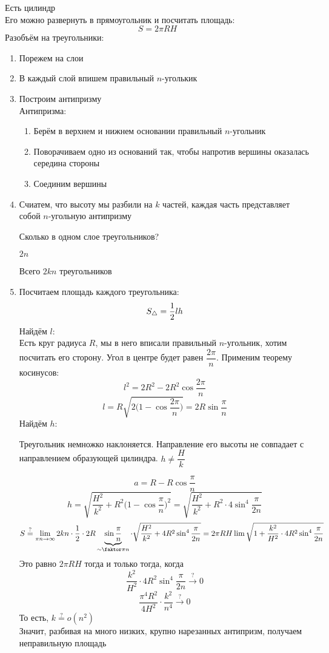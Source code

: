 \begin{eg}
	Есть цилиндр \\
	Его можно развернуть в прямоугольник и посчитать площадь:
	$$ S = 2\pi R H $$
	Разобъём на треугольники:
	\begin{enumerate}
		\item Порежем на слои
		\item В каждый слой впишем правильный $ n $-уголькик
		\item Построим антипризму \\
		Антипризма:
		\begin{enumerate}
			\item Берём в верхнем и нижнем основании правильный $ n $-угольник
			\item Поворачиваем одно из оснований так, чтобы напротив вершины оказалась середина стороны
			\item Соединим вершины
		\end{enumerate}
		\item Счиатем, что высоту мы разбили на $ k $ частей, каждая часть представляет собой $ n $-угольную антипризму
		\begin{quest}
			Сколько в одном слое треугольников?
		\end{quest}
		\begin{answer}
			$ 2n $
		\end{answer}
		Всего $ 2kn $ треугольников
		\item Посчитаем площадь каждого треугольника:
		$$ S_\triangle = \frac{1}2 lh $$
		Найдём $ l $: \\
		Есть круг радиуса $ R $, мы в него вписали правильный $ n $-угольник, хотим посчитать его сторону.  Угол в центре будет равен $ \dfrac{2\pi}n $. Применим теорему косинусов:
		$$ l^2 = 2R^2 - 2R^2 \cos \frac{2\pi}n $$
		$$ l = R \sqrt{2 \bigg( 1 - \cos \frac{2\pi}n \bigg) } = 2R\sin \frac\pi{n} $$
		Найдём $ h $:
		\begin{remark}
			Треугольник немножко наклоняется. Направление его высоты не совпадает с направлением образующей цилиндра. $ h \ne \dfrac{H}k $
		\end{remark}
		$$ a = R - R \cos \frac\pi{n} $$
		$$ h = \sqrt{\frac{H^2}{k^2} + R^2 \bigg(1 - \cos \frac\pi{n} \bigg)^2} = \sqrt{\frac{H^2}{k^2} + R^2 \cdot 4 \sin^4 \frac\pi{2n}} $$
		$$ S \stackrel?= \limi{\pi n} 2kn \cdot \half \cdot 2R\underbrace{\sin \frac\pi{n}}_{\sim \faktor\pi{n}} \cdot \sqrt{\frac{H^2}{k^2} + 4R^2 \sin^4 \frac\pi{2n}} = 2\pi RH \lim \sqrt{1 + \frac{k^2}{H^2} \cdot 4R^2 \sin^4 \frac\pi{2n}} $$
		Это равно $ 2\pi RH $ тогда и только тогда, когда
		$$ \frac{k^2}{H^2} \cdot 4R^2 \sin^4 \frac\pi{2n} \stackrel?\to 0 $$
		$$ \frac{\pi^4R^2}{4H^2} \cdot \frac{k^2}{n^4} \stackrel?\to 0 $$
		То есть, $ k \stackrel?= o(n^2) $ \\
		Значит, разбивая на много низких, крупно нарезанных антипризм, получаем неправильную площадь
	\end{enumerate}
\end{eg}

